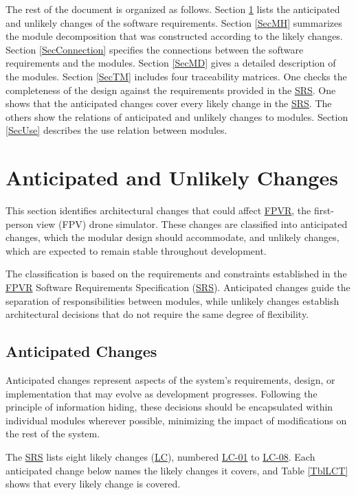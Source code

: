 \documentclass[12pt, titlepage]{article}
\DeclareRobustCommand{\mgabbr}[2]{\hyperlink{mg-abbr:#1}{#2}}
\begin{document}
The rest of the document is organized as follows. Section
\ref{SecChange} lists the anticipated and unlikely changes of the software
requirements. Section \ref{SecMH} summarizes the module decomposition that
was constructed according to the likely changes. Section \ref{SecConnection}
specifies the connections between the software requirements and the
modules. Section \ref{SecMD} gives a detailed description of the
modules. Section \ref{SecTM} includes four traceability matrices. One checks
the completeness of the design against the requirements provided in the
\mgabbr{srs}{SRS}.
One shows that the anticipated changes cover every likely change in the
\mgabbr{srs}{SRS}.
The others show the relations of anticipated and unlikely changes to modules.
Section
\ref{SecUse} describes the use relation between modules.



\section{Anticipated and Unlikely Changes} \label{SecChange}
This section identifies architectural changes that could affect
\mgabbr{fpvr}{FPVR}, the first-person view (FPV) drone simulator.
These changes are classified into anticipated changes, which the modular design
should accommodate, and
unlikely changes, which are expected to remain stable throughout development.

The classification is based on the requirements and constraints established in
the \mgabbr{fpvr}{FPVR} Software
Requirements Specification (\mgabbr{srs}{SRS}). Anticipated changes guide the
separation of responsibilities between
modules, while unlikely changes establish architectural decisions that do not
require the same degree of
flexibility.

\subsection{Anticipated Changes} \label{SecAchange}

Anticipated changes represent aspects of the system's requirements, design, or
 implementation that may evolve as development progresses. Following the
 principle
 of information hiding, these decisions should be encapsulated within individual
 modules wherever possible, minimizing the impact of modifications on the rest
 of the system.

The \mgabbr{srs}{SRS} lists eight likely changes (\mgabbr{lc}{LC}), numbered
\mgabbr{lc}{LC-01} to \mgabbr{lc}{LC-08}. Each anticipated change
below names the likely changes it covers, and Table \ref{TblLCT} shows that
every likely change is covered.
\end{document}

